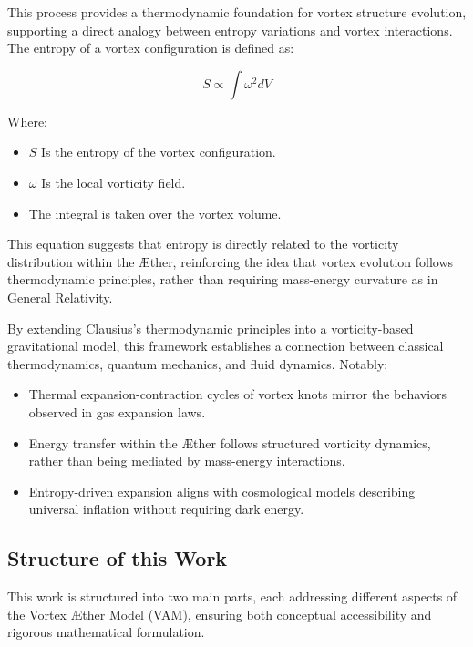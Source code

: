 This process provides a thermodynamic foundation for vortex structure evolution, supporting a direct analogy between entropy variations and vortex interactions.
The entropy of a vortex configuration is defined as:

\begin{equation*} \label{eq:Entropy}
S \propto \int \omega^2 dV
\end{equation*}

Where:

\begin{itemize}
    \item \( S \) Is the entropy of the vortex configuration.
    \item \( \omega \)  Is the local vorticity field.
    \item The integral is taken over the vortex volume.
\end{itemize}

This equation suggests that entropy is directly related to the vorticity distribution within the Æther, reinforcing the idea that vortex evolution follows thermodynamic principles, rather than requiring mass-energy curvature as in General Relativity.

By extending Clausius’s thermodynamic principles into a vorticity-based gravitational model, this framework establishes a connection between classical thermodynamics, quantum mechanics, and fluid dynamics. Notably:

\begin{itemize}
    \item Thermal expansion-contraction cycles of vortex knots mirror the behaviors observed in gas expansion laws.
    \item Energy transfer within the Æther follows structured vorticity dynamics, rather than being mediated by mass-energy interactions.
    \item Entropy-driven expansion aligns with cosmological models describing universal inflation without requiring dark energy.
\end{itemize}

\subsection*{Structure of this Work}

This work is structured into two main parts, each addressing different aspects of the Vortex Æther Model (VAM), ensuring both conceptual accessibility and rigorous mathematical formulation.

